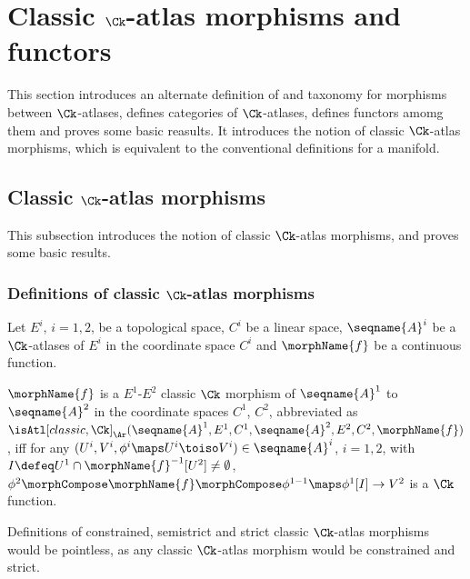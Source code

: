 \documentclass{article}
\begin{document}
\section{Classic \ensuremath{\Ck}-atlas morphisms and functors}
\label{sec:Ck-ATLcmorph}
This section introduces an alternate definition of and taxonomy for
morphisms between $\Ck$-atlases, defines categories of $\Ck$-atlases,
defines functors amomg them and proves some basic reasults.  It
introduces the notion of classic $\Ck$-atlas morphisms, which is
equivalent to the conventional definitions for a manifold.

\subsection{Classic \ensuremath{\Ck}-atlas  morphisms}
\label{sub:Ck-ATLcmorph}
This subsection introduces the notion of classic $\Ck$-atlas morphisms,
and proves some basic results.

\subsubsection{Definitions of classic \ensuremath{\Ck}-atlas morphisms}

\begin{definition}
\label{def:Ck-ATLcmorph}
Let $E^i$, $i=1,2$, be a topological space, $C^i$ be a linear space,
$\seqname{A}^i$ be a $\Ck$-atlases of $E^i$ in the coordinate space
$C^i$ and $\morphName{f}$ be a continuous function.

$\morphName{f}$ is a $E^1$-$E^2$ classic $\Ck$ morphism of
$\seqname{A}^1$ to $\seqname{A}^2$ in the coordinate spaces $C^1$,
$C^2$, abbreviated as
$
\isAtl[classic,\Ck]_\Ar
  (
    \seqname{A}^1,
    E ^1,
    C^1,
    \seqname{A}^2,
    E^2,
    C^2,
    \morphName{f}
  )
$,
iff for any
$(U^i, V^i, \phi^i \maps U^i \toiso V^i) \in \seqname{A}^i$,
$i=1,2$, with $I \defeq U^1 \cap \morphName{f}^{-1}[U^2] \neq \emptyset$,
$
  \phi^2 \morphCompose \morphName{f} \morphCompose \phi^{1-1} \maps
    \phi^1[I] \to V^2
$
is a $\Ck$ function.
\end{definition}

\begin{remark}
Definitions of constrained, semistrict and strict classic $\Ck$-atlas
morphisms would be pointless, as any classic $\Ck$-atlas
morphism would be constrained and strict.
\end{remark}
\end{document}
